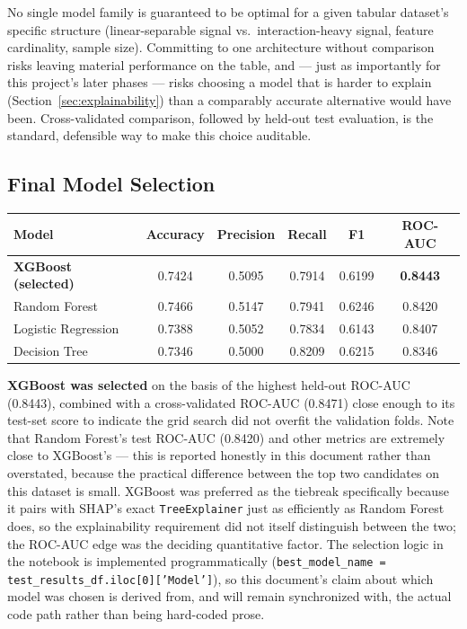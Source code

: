 \documentclass[11pt]{article}
\begin{document}
No single model family is guaranteed to be optimal for a given tabular dataset's specific structure (linear-separable signal vs.\ interaction-heavy signal, feature cardinality, sample size). Committing to one architecture without comparison risks leaving material performance on the table, and --- just as importantly for this project's later phases --- risks choosing a model that is harder to explain (Section~\ref{sec:explainability}) than a comparably accurate alternative would have been. Cross-validated comparison, followed by held-out test evaluation, is the standard, defensible way to make this choice auditable.

\subsection{Final Model Selection}
\label{sec:modelselection}

\begin{center}
\begin{tabular}{lccccc}
\toprule
\textbf{Model} & \textbf{Accuracy} & \textbf{Precision} & \textbf{Recall} & \textbf{F1} & \textbf{ROC-AUC} \\
\midrule
\textbf{XGBoost (selected)} & 0.7424 & 0.5095 & 0.7914 & 0.6199 & \textbf{0.8443} \\
Random Forest & 0.7466 & 0.5147 & 0.7941 & 0.6246 & 0.8420 \\
Logistic Regression & 0.7388 & 0.5052 & 0.7834 & 0.6143 & 0.8407 \\
Decision Tree & 0.7346 & 0.5000 & 0.8209 & 0.6215 & 0.8346 \\
\bottomrule
\end{tabular}
\end{center}

\textbf{XGBoost was selected} on the basis of the highest held-out ROC-AUC (0.8443), combined with a cross-validated ROC-AUC (0.8471) close enough to its test-set score to indicate the grid search did not overfit the validation folds. Note that Random Forest's test ROC-AUC (0.8420) and other metrics are extremely close to XGBoost's --- this is reported honestly in this document rather than overstated, because the practical difference between the top two candidates on this dataset is small. XGBoost was preferred as the tiebreak specifically because it pairs with SHAP's exact \texttt{TreeExplainer} just as efficiently as Random Forest does, so the explainability requirement did not itself distinguish between the two; the ROC-AUC edge was the deciding quantitative factor. The selection logic in the notebook is implemented programmatically (\texttt{best\_model\_name = test\_results\_df.iloc[0]['Model']}), so this document's claim about which model was chosen is derived from, and will remain synchronized with, the actual code path rather than being hard-coded prose.
\end{document}
